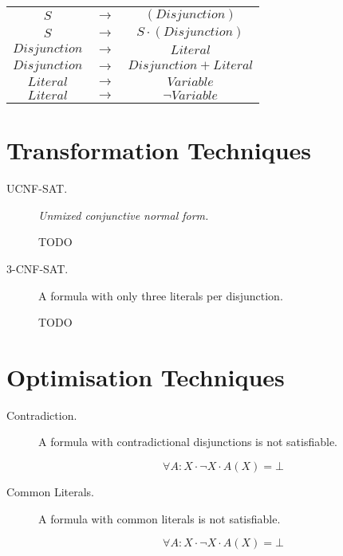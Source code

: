 \documentclass[12pt, letterpaper]{article}
\begin{document}
\begin{description}
            \begin{tabular}{ccc}
                $S$ & $\rightarrow$& $(Disjunction)$ \\ 
                $S$ & $\rightarrow$& $S \cdot (Disjunction)$ \\ 
                $Disjunction$ & $\rightarrow$& $Literal$ \\ 
                $Disjunction$ & $\rightarrow$& $Disjunction + Literal$ \\ 
                $Literal$ & $\rightarrow$& $Variable$ \\ 
                $Literal$ & $\rightarrow$& $\lnot Variable$ \\ 
            \end{tabular}
        
    \end{description}

    \section{Transformation Techniques}

    \begin{description}

        \item[UCNF-SAT.]
            \textit{Unmixed conjunctive normal form.}

            TODO

        \item[3-CNF-SAT.]
            A formula with only three literals per disjunction.
            
            TODO

    \end{description}

    \section{Optimisation Techniques}

    \begin{description}

        \item[Contradiction.]

            A formula with contradictional disjunctions
            is not satisfiable.
            
            \[\forall A : X \cdot \lnot X \cdot A(X) = \bot \]
        
        \item[Common Literals.]

            A formula with common literals
            is not satisfiable.
            
            \[\forall A : X \cdot \lnot X \cdot A(X) = \bot \]
        
    \end{description}
\end{document}

